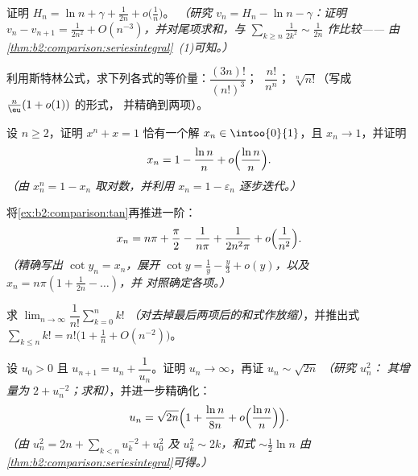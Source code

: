 \begin{exercise}[$\star\star$]\label{exo:b2:comparison:3}
证明 $H_n = \ln n + \gamma + \frac{1}{2n} + o\bigl(\frac1n\bigr)$。
\emph{（研究 $v_n = H_n - \ln n - \gamma$：证明 $v_n - v_{n+1} =
\frac{1}{2n^2} + O(n^{-3})$，并对尾项求和，与
$\sum_{k \geq n} \frac{1}{2k^2} \sim \frac{1}{2n}$ 作比较——
由\cref{thm:b2:comparison:seriesintegral}~(1)可知。）}
\end{exercise}

\begin{exercise}[$\star\star$]\label{exo:b2:comparison:4}
利用斯特林公式，求下列各式的等价量：$\dfrac{(3n)!}{(n!)^3}$；
$\;\dfrac{n!}{n^n}$；$\;\sqrt[n]{n!}$（写成 $\frac n\eu(1 + o(1))$ 的形式，
并精确到两项）。
\end{exercise}

\begin{exercise}[$\star\star$]\label{exo:b2:comparison:5}
设 $n \geq 2$，证明 $x^n + x = 1$ 恰有一个解 $x_n
\in \intoo{0}{1}$，且 $x_n \to 1$，并证明
\[
x_n = 1 - \frac{\ln n}{n} + o\Bigl(\frac{\ln n}{n}\Bigr).
\]
\emph{（由 $x_n^n = 1 - x_n$ 取对数，并利用
$x_n = 1 - \varepsilon_n$ 逐步迭代。）}
\end{exercise}

\begin{exercise}[$\star\star$]\label{exo:b2:comparison:6}
将\cref{ex:b2:comparison:tan}再推进一阶：
\[
x_n = n\pi + \frac\pi2 - \frac{1}{n\pi} + \frac{1}{2n^2\pi} +
o\Bigl(\frac{1}{n^2}\Bigr).
\]
\emph{（精确写出 $\cot y_n = x_n$，展开 $\cot y = \frac1y -
\frac y3 + o(y)$，以及 $x_n = n\pi(1 + \frac{1}{2n} - \dots)$，并
对照确定各项。）}
\end{exercise}

\begin{exercise}[$\star\star$]\label{exo:b2:comparison:7}
求 $\lim_{n\to\infty} \dfrac{1}{n!}\sum_{k=0}^{n} k!$
\emph{（对去掉最后两项后的和式作放缩）}，并推出式
$\sum_{k \leq n} k! = n!\bigl(1 + \frac1n +
O(n^{-2})\bigr)$。
\end{exercise}

\begin{exercise}[$\star\star\star$]\label{exo:b2:comparison:8}
设 $u_0 > 0$ 且 $u_{n+1} = u_n + \dfrac{1}{u_n}$。证明 $u_n
\to \infty$，再证 $u_n \sim \sqrt{2n}$ \emph{（研究 $u_n^2$：
其增量为 $2 + u_n^{-2}$；求和）}，并进一步精确化：
\[
u_n = \sqrt{2n}\Bigl(1 + \frac{\ln n}{8n} +
o\Bigl(\frac{\ln n}{n}\Bigr)\Bigr).
\]
\emph{（由 $u_n^2 = 2n + \sum_{k<n} u_k^{-2} + u_0^2$ 及 $u_k^2
\sim 2k$，和式 $\sim \frac12\ln n$ 由
\cref{thm:b2:comparison:seriesintegral}可得。）}
\end{exercise}

